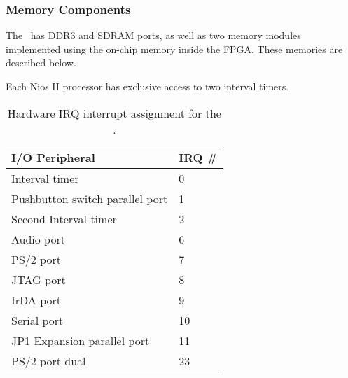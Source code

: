 






\subsubsection{Memory Components}

The \systemName~has DDR3 and SDRAM ports, as well as two memory modules implemented 
using the on-chip memory inside the FPGA. These memories are described below.

















Each Nios II processor has exclusive access to two interval timers.





\begin{table}[h]
    \begin{center}
    \begin{tabular}{l|l}
            \textbf{I/O Peripheral} &
            \textbf{IRQ \#}
        \\\hline
            Interval timer & 0
        \\
            Pushbutton switch parallel port & 1
        \\
            Second Interval timer & 2
        \\
            Audio port & 6
        \\
            PS/2 port & 7
        \\
            JTAG port & 8
				\\
						IrDA port & 9
        \\
            Serial port & 10
        \\
            JP1 Expansion parallel port & 11
        \\
						PS/2 port dual & 23
				\\
    \end{tabular}
    \caption{Hardware IRQ interrupt assignment for the \systemName.}
	 \label{tab:irq}
    \end{center}
\end{table}
\newpage

